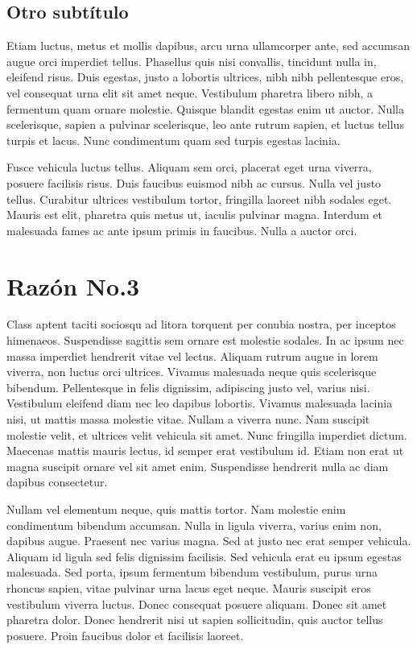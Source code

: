 \documentclass[11pt,letterpaper]{article}
\begin{document}
\subsection{Otro subtítulo}

Etiam luctus, metus et mollis dapibus, arcu urna ullamcorper ante, sed accumsan augue orci imperdiet tellus. Phasellus quis nisi convallis, tincidunt nulla in, eleifend risus. Duis egestas, justo a lobortis ultrices, nibh nibh pellentesque eros, vel consequat urna elit sit amet neque. Vestibulum pharetra libero nibh, a fermentum quam ornare molestie. Quisque blandit egestas enim ut auctor. Nulla scelerisque, sapien a pulvinar scelerisque, leo ante rutrum sapien, et luctus tellus turpis et lacus. Nunc condimentum quam sed turpis egestas lacinia.

Fusce vehicula luctus tellus. Aliquam sem orci, placerat eget urna viverra, posuere facilisis risus. Duis faucibus euismod nibh ac cursus. Nulla vel justo tellus. Curabitur ultrices vestibulum tortor, fringilla laoreet nibh sodales eget. Mauris est elit, pharetra quis metus ut, iaculis pulvinar magna. Interdum et malesuada fames ac ante ipsum primis in faucibus. Nulla a auctor orci.

\section{Razón No.3}

Class aptent taciti sociosqu ad litora torquent per conubia nostra, per inceptos himenaeos. Suspendisse sagittis sem ornare est molestie sodales. In ac ipsum nec massa imperdiet hendrerit vitae vel lectus. Aliquam rutrum augue in lorem viverra, non luctus orci ultrices. Vivamus malesuada neque quis scelerisque bibendum. Pellentesque in felis dignissim, adipiscing justo vel, varius nisi. Vestibulum eleifend diam nec leo dapibus lobortis. Vivamus malesuada lacinia nisi, ut mattis massa molestie vitae. Nullam a viverra nunc. Nam suscipit molestie velit, et ultrices velit vehicula sit amet. Nunc fringilla imperdiet dictum. Maecenas mattis mauris lectus, id semper erat vestibulum id. Etiam non erat ut magna suscipit ornare vel sit amet enim. Suspendisse hendrerit nulla ac diam dapibus consectetur.

Nullam vel elementum neque, quis mattis tortor. Nam molestie enim condimentum bibendum accumsan. Nulla in ligula viverra, varius enim non, dapibus augue. Praesent nec varius magna. Sed at justo nec erat semper vehicula. Aliquam id ligula sed felis dignissim facilisis. Sed vehicula erat eu ipsum egestas malesuada. Sed porta, ipsum fermentum bibendum vestibulum, purus urna rhoncus sapien, vitae pulvinar urna lacus eget neque. Mauris suscipit eros vestibulum viverra luctus. Donec consequat posuere aliquam. Donec sit amet pharetra dolor. Donec hendrerit nisi ut sapien sollicitudin, quis auctor tellus posuere. Proin faucibus dolor et facilisis laoreet.
\end{document}
